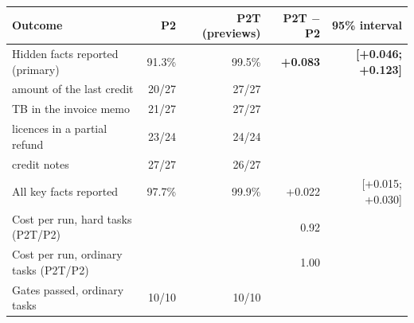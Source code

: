 \begin{tabular}{lrrrr}
\toprule
Outcome & P2 & P2T (previews) & P2T $-$ P2 & 95\% interval \\
\midrule
Hidden facts reported (primary) & 91.3\% & 99.5\% & \textbf{+0.083} & \textbf{[+0.046; +0.123]} \\
\quad amount of the last credit & 20/27 & 27/27 & & \\
\quad TB in the invoice memo & 21/27 & 27/27 & & \\
\quad licences in a partial refund & 23/24 & 24/24 & & \\
\quad credit notes & 27/27 & 26/27 & & \\
All key facts reported & 97.7\% & 99.9\% & +0.022 & [+0.015; +0.030] \\
Cost per run, hard tasks (P2T/P2) & & & 0.92 & \\
Cost per run, ordinary tasks (P2T/P2) & & & 1.00 & \\
Gates passed, ordinary tasks & 10/10 & 10/10 & & \\
\bottomrule
\end{tabular}
